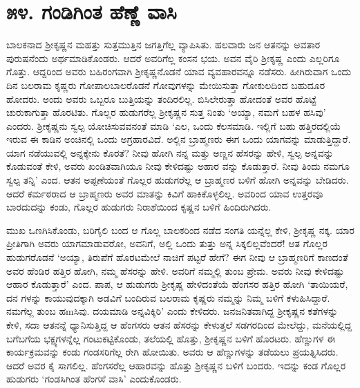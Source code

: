 
\chapter{೫೪. ಗಂಡಿಗಿಂತ ಹೆಣ್ಣೆ ವಾಸಿ}

ಬಾಲಕನಾದ ಶ್ರೀಕೃಷ್ಣನ ಮಹತ್ತು ಸುತ್ತಮುತ್ತಿನ ಜಗತ್ತಿಗೆಲ್ಲ ವ್ಯಾಪಿಸಿತು. ಹಲವಾರು ಜನ ಆತನನ್ನು ಅವತಾರ ಪುರುಷನೆಂದು ಅರ್ಥಮಾಡಿಕೊಂಡರು. ಆದರೆ ಅವರಿಗೆಲ್ಲ ಕಂಸನ ಭಯ. ಅವನ ವೈರಿ ಶ್ರೀಕೃಷ್ಣ ಎಂದು ಎಲ್ಲರಿಗೂ ಗೊತ್ತು. ಆದ್ದರಿಂದ ಅವರು ಬಹಿರಂಗವಾಗಿ ಶ್ರೀಕೃಷ್ಣನೊಡನೆ ಯಾವ ವ್ಯವಹಾರವನ್ನೂ ನಡೆಸರು. ಹೀಗಿರುವಾಗ ಒಂದು ದಿನ ಬಲರಾಮ ಕೃಷ್ಣರು ಗೋಪಾಲಬಾಲರೊಡನೆ ಗೋವುಗಳನ್ನು ಮೇಯಿಸುತ್ತಾ ಗೋಕುಲದಿಂದ ಬಹುದೂರ ಹೋದರು. ಅಂದು ಅವರು ಒಬ್ಬರೂ ಬುತ್ತಿಯನ್ನು ತಂದಿರಲಿಲ್ಲ. ಬಿಸಿಲೇರುತ್ತಾ ಹೋದಂತೆ ಅವರ ಹೊಟ್ಟೆ ಚುರುಕಾಗುತ್ತಾ ಹೊರಟಿತು. ಗೊಲ್ಲರ ಹುಡುಗರೆಲ್ಲ ಶ್ರೀಕೃಷ್ಣನ ಸುತ್ತ ನಿಂತು ‘ಅಯ್ಯಾ, ನಮಗೆ ಬಹಳ ಹಸಿವು’ ಎಂದರು. ಶ್ರೀಕೃಷ್ಣನು ಸ್ವಲ್ಪ ಯೋಚಿಸುವವನಂತೆ ಮಾಡಿ ‘ಎಲ, ಒಂದು ಕೆಲಸಮಾಡಿ. ಇಲ್ಲಿಗೆ ಬಹು ಹತ್ತಿರದಲ್ಲಿಯೆ ಇರುವ ಈ ಕಾಡಿನ ಅಂಚಿನಲ್ಲಿ ಒಂದು ಅಗ್ರಹಾರವಿದೆ. ಅಲ್ಲಿನ ಬ್ರಾಹ್ಮಣರು ಈಗ ಒಂದು ಯಾಗವನ್ನು ಮಾಡುತ್ತಿದ್ದಾರೆ. ಯಾಗ ನಡೆಯುವಲ್ಲಿ ಅನ್ನಕ್ಕೇನು ಕೊರತೆ? ನೀವು ಹೋಗಿ ನನ್ನ ಮತ್ತು ಅಣ್ಣನ ಹೆಸರನ್ನು ಹೇಳಿ, ಸ್ವಲ್ಪ ಅನ್ನವನ್ನು ಕೊಡುವಂತೆ ಕೇಳಿ, ಅವರು ಖಂಡಿತವಾಗಿಯೂ ನೀವು ಕೇಳಿದಷ್ಟು ಅಹಾರ ವನ್ನು ಕೊಡುತ್ತಾರೆ. ನೀವು ತಿಂದು ನಮಗೂ ಸ್ವಲ್ಪ ತನ್ನಿ’ ಎಂದ. ಆತನ ಅಪ್ಪಣೆಯಂತೆ ಗೊಲ್ಲರ ಹುಡುಗರೆಲ್ಲ ಆ ಬ್ರಾಹ್ಮಣರ ಬಳಿಗೆ ಹೋಗಿ ಅನ್ನವನ್ನು ಬೇಡಿದರು. ಆದರೆ ಕರ್ಮಠರಾದ ಆ ಬ್ರಾಹ್ಮಣರು ಅವರ ಮಾತನ್ನು ಕಿವಿಗೆ ಹಾಕಿಕೊಳ್ಳಲಿಲ್ಲ. ಅವರಿಂದ ಯಾವ ಉತ್ತರವೂ ಬಾರದುದನ್ನು ಕಂಡು, ಗೊಲ್ಲರ ಹುಡುಗರು ನಿರಾಶೆಯಿಂದ ಕೃಷ್ಣನ ಬಳಿಗೆ ಹಿಂದಿರುಗಿದರು.

ಮುಖ ಒಣಗಿಸಿಕೊಂಡು, ಬರಿಗೈಲಿ ಬಂದ ಆ ಗೊಲ್ಲ ಬಾಲಕರಿಂದ ನಡೆದ ಸಂಗತಿ ಯನ್ನೆಲ್ಲ ಕೇಳಿ, ಶ್ರೀಕೃಷ್ಣ ನಕ್ಕ. ಯಾರ ಪ್ರೀತಿಗಾಗಿ ಅವರು ಯಾಗಮಾಡುವರೋ, ಅವನಿಗೆ, ಅಲ್ಲಿ ಒಂದು ತುತ್ತು ಅನ್ನ ಸಿಕ್ಕಲಿಲ್ಲವೆಂದರೆ! ಆತ ಗೊಲ್ಲರ ಹುಡುಗರೊಡನೆ ‘ಅಯ್ಯಾ, ತಿರುಪೆಗೆ ಹೊರಟಮೇಲೆ ನಾಚಿಗೆ ಪಟ್ಟರೆ ಹೇಗೆ? ಈಗ ನೀವು ಆ ಬ್ರಾಹ್ಮಣರಿಗೆ ಕಾಣದಂತೆ ಅವರ ಹೆಂಡಿರ ಹತ್ತಿರ ಹೋಗಿ, ನಮ್ಮ ಹೆಸರನ್ನು ಹೇಳಿ. ಅವರಿಗೆ ನಮ್ಮಲ್ಲಿ ತುಂಬ ಪ್ರೇಮ. ಅವರು ನೀವು ಕೇಳಿದಷ್ಟು ಆಹಾರ ಕೊಡುತ್ತಾರೆ’ ಎಂದ. ಪಾಪ, ಆ ಹುಡುಗರು ಶ್ರೀಕೃಷ್ಣ ಹೇಳಿದಂತೆಯೆ ಹೆಂಗಸರ ಹತ್ತಿರ ಹೋಗಿ ‘ತಾಯಿಯರೆ, ದನ ಗಳನ್ನು ಕಾಯುವುದಕ್ಕಾಗಿ ಅಡವಿಗೆ ಬಂದಿರುವ ಬಲರಾಮ ಕೃಷ್ಣರು ನಮ್ಮನ್ನು ನಿಮ್ಮ ಬಳಿಗೆ ಕಳುಹಿಸಿದ್ದಾರೆ. ನಮಗೆಲ್ಲ ತುಂಬ ಹmಸಿವು. ದಯಮಾಡಿ ಅನ್ನವಿಕ್ಕಿರಿ’ ಎಂದು ಕೇಳಿದರು. ಜನಜನಿತವಾಗಿದ್ದ ಶ್ರೀಕೃಷ್ಣನ ಕತೆಗಳನ್ನು ಕೇಳಿ, ಸದಾ ಆತನನ್ನೆ ಧ್ಯಾನಿಸುತ್ತಿದ್ದ ಆ ಹೆಂಗಸರು ಆತನ ಹೆಸರನ್ನು ಕೇಳುತ್ತಲೆ ಸಡಗರದಿಂದ ಮೇಲೆದ್ದು, ಮನೆಯಲ್ಲಿದ್ದ ಬಗೆಬಗೆಯ ಭಕ್ಷ್ಯಗಳನ್ನೆಲ್ಲ ಗಂಟುಕಟ್ಟಿಕೊಂಡು, ತಲೆಯಲ್ಲಿ ಹೊತ್ತು, ಶ್ರೀಕೃಷ್ಣನ ಬಳಿಗೆ ಹೊರಟರು. ಹೆಣ್ಣುಗಳ ಈ ಕಾರ್ಯಕ್ರಮವನ್ನು ಕಂಡು ಗಂಡಸರಿಗೆಲ್ಲ ರೇಗಿ ಹೋಯಿತು. ಅವರು ಆ ಹೆಣ್ಣುಗಳನ್ನು ತಡೆಯಲು ಪ್ರಯತ್ನಿಸಿದರು. ಆದರೆ ಅವರ ಕೈ ಸಾಗಲಿಲ್ಲ. ಹೆಂಗಸರೆಲ್ಲ ಆಹಾರವನ್ನು ಹೊತ್ತು ಶ್ರೀಕೃಷ್ಣನ ಬಳಿಗೆ ಬಂದರು. ಇದನ್ನು ಕಂಡ ಗೊಲ್ಲರ ಹುಡುಗರು ‘ಗಂಡಸಿಗಿಂತ ಹೆಂಗಸೆ ವಾಸಿ’ ಎಂದುಕೊಂಡರು.

